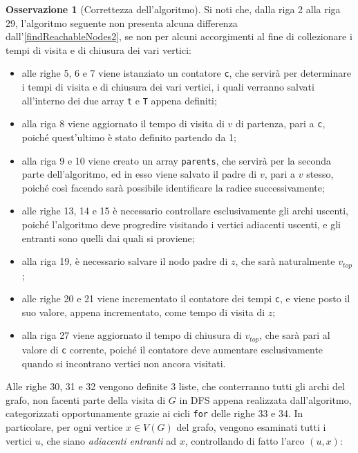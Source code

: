 \documentclass[14pt]{extreport}
\theoremstyle{definition}
\theoremstyle{definition}
\newtheorem{remark}{Osservazione}[subsection]
\begin{document}
\begin{remark}[Correttezza dell'algoritmo]
    Si noti che, dalla riga 2 alla riga 29, l'algoritmo seguente non presenta alcuna differenza dall'\cref{findReachableNodes2}, se non per alcuni accorgimenti al fine di collezionare i tempi di visita e di chiusura dei vari vertici:

    \begin{itemize}
        \item alle righe 5, 6 e 7 viene istanziato un contatore \texttt{c}, che servirà per determinare i tempi di visita e di chiusura dei vari vertici, i quali verranno salvati all'interno dei due array \texttt{t} e \texttt{T} appena definiti;
        \item alla riga 8 viene aggiornato il tempo di visita di $v$ di partenza, pari a \texttt{c}, poiché quest'ultimo è stato definito partendo da 1;
        \item alla riga 9 e 10 viene creato un array \texttt{parents}, che servirà per la seconda parte dell'algoritmo, ed in esso viene salvato il padre di $v$, pari a $v$ stesso, poiché così facendo sarà possibile identificare la radice successivamente;
        \item alle righe 13, 14 e 15 è necessario controllare esclusivamente gli archi uscenti, poiché l'algoritmo deve progredire visitando i vertici adiacenti uscenti, e gli entranti sono quelli dai quali si proviene;
        \item alla riga 19, è necessario salvare il nodo padre di $z$, che sarà naturalmente $v_{top}$;
        \item alle righe 20 e 21 viene incrementato il contatore dei tempi \texttt{c}, e viene posto il suo valore, appena incrementato, come tempo di visita di $z$;
        \item alla riga 27 viene aggiornato il tempo di chiusura di $v_{top}$, che sarà pari al valore di \texttt{c} corrente, poiché il contatore deve aumentare esclusivamente quando si incontrano vertici non ancora visitati.
    \end{itemize}

    Alle righe 30, 31 e 32 vengono definite 3 liste, che conterranno tutti gli archi del grafo, non facenti parte della visita di $G$ in DFS appena realizzata dall'algoritmo, categorizzati opportunamente grazie ai cicli \texttt{for} delle righe 33 e 34. In particolare, per ogni vertice $x \in V(G)$ del grafo, vengono esaminati tutti i vertici $u$, che siano \textit{adiacenti entranti} ad $x$, controllando di fatto l'arco $(u, x)$:


\end{remark}
\end{document}
